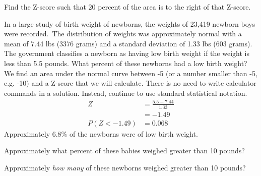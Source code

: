 \begin{exercisewrap}
\begin{nexercise}Find the Z-score such that 20 percent of the area is to the right of that Z-score.\footnotemark\end{nexercise}
\end{exercisewrap}	


\begin{examplewrap}
\begin{nexample}{In a large study of birth weight of newborns, the weights of 23,419 newborn boys were recorded.\footnotemark\, The distribution of weights was approximately normal with a mean of 7.44 lbs (3376 grams) and a standard deviation of 1.33 lbs (603 grams). The government classifies a newborn as having low birth weight if the weight is less than 5.5 pounds. What percent of these newborns had a low birth weight?}
We find an area under the normal curve between -5 (or a number smaller than -5, e.g. -10) and a Z-score that we will calculate. There is no need to write calculator commands in a solution. Instead, continue to use standard statistical notation. 
\begin{align*}
Z&=\frac{5.5-7.44}{1.33}\\
&=-1.49\\
P(Z < -1.49) &= 0.068
\end{align*}
Approximately 6.8\% of the newborns were of low birth weight.
\end{nexample}
\end{examplewrap}

\begin{exercisewrap}
\begin{nexercise}Approximately what percent of these babies weighed greater than 10 pounds?\footnotemark\end{nexercise}
\end{exercisewrap}


\begin{exercisewrap}
\begin{nexercise}Approximately \emph{how many} of these newborns weighed greater than 10 pounds?\footnotemark
\end{nexercise}
\end{exercisewrap}

